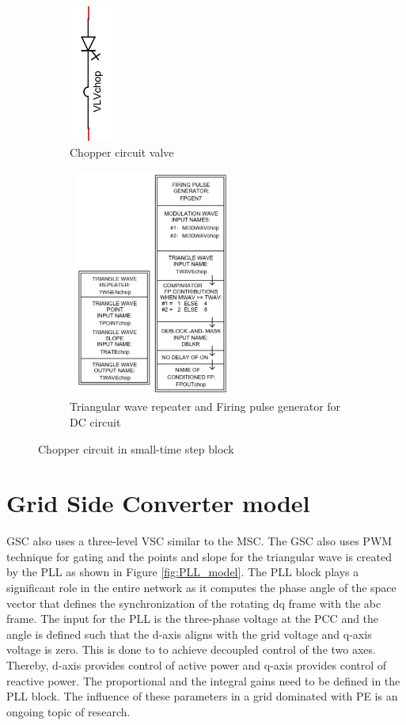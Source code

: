 \begin{figure}[H]
\centering
\begin{subfigure}{.3\textwidth}
  \centering
  \includegraphics[height=4.5cm,width=1.5cm]{Diagrams/Appendix_A/Chopper_circuit.PNG}
  \caption{Chopper circuit valve}
  \label{fig:Chopper_circuit}
\end{subfigure}%
\begin{subfigure}{.5\textwidth}
  \centering
  \includegraphics[height=7.5cm,width=5.5cm]{Diagrams/Appendix_A/Chopper_circuit_firing.PNG}
  \caption{Triangular wave repeater and Firing pulse generator for DC circuit}
  \label{fig:Chopper_circuit_firing}
\end{subfigure}
\caption{Chopper circuit in small-time step block}
\label{fig:Chopper_circuit_valve_firing}
\end{figure}

\section{Grid Side Converter model}
\gls{GSC} also uses a three-level \gls{VSC} similar to the \gls{MSC}. The \gls{GSC} also uses \gls{PWM} technique for gating and the points and slope for the triangular wave is created by the \gls{PLL} as shown in Figure \ref{fig:PLL_model}. The \gls{PLL} block plays a significant role in the entire network as it computes the phase angle of the space vector that defines the synchronization of the rotating dq frame with the abc frame. The input for the \gls{PLL} is the three-phase voltage at the \gls{PCC} and the angle is defined such that the d-axis aligns with the grid voltage and q-axis voltage is zero. This is done to to achieve decoupled control of the two axes. Thereby, d-axis provides control of active power and q-axis provides control of reactive power. The proportional and the integral gains need to be defined in the \gls{PLL} block. The influence of these parameters in a grid dominated with \gls{PE} is an ongoing topic of research.

